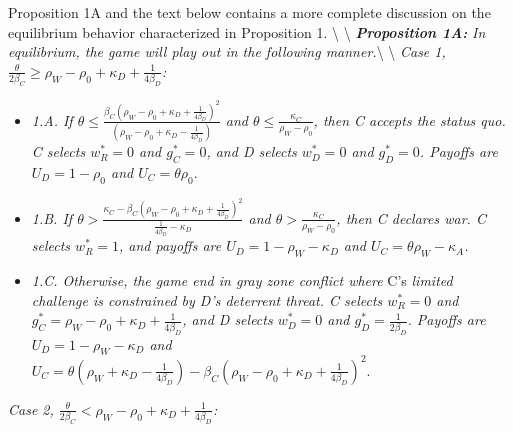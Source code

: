 \documentclass[
]{article}
\begin{document}
Proposition 1A and the text below contains a more complete discussion on
the equilibrium behavior characterized in Proposition 1.
\textbackslash{} \textbackslash{}
\textbf{\textit{Proposition 1A:}}\textit{ In equilibrium, the game will play out in the following manner.}\textbackslash{}
\textbackslash{}
\textit{Case 1, $\frac{\theta}{2\beta_{C}}\geq\rho_{W}-\rho_{0}+\kappa_{D}+\frac{1}{4\beta_{D}}$:}

\begin{itemize}
\item \textit{1.A. If $\theta\leq\frac{\beta_{C}\left(\rho_{W}-\rho_{0}+\kappa_{D}+\frac{1}{4\beta_{D}}\right)^{2}}{\left(\rho_{W}-\rho_{0}+\kappa_{D}-\frac{1}{4\beta_{D}}\right)}$ and $\theta\leq\frac{\kappa_{C}}{\rho_{W}-\rho_{0}}$, then C accepts the status quo. C selects $w_{R}^{*}=0$ and $g_{C}^{*}=0$, and D selects $w_{D}^{*}=0$ and $g_{D}^{*}=0$. Payoffs are $U_{D}=1-\rho_{0}$ and $U_{C}=\theta\rho_{0}.$} 
\item \textit{1.B. If $\theta>\frac{\kappa_{C}-\beta_{C}\left(\rho_{W}-\rho_{0}+\kappa_{D}+\frac{1}{4\beta_{D}}\right)^{2}}{\frac{1}{4\beta_{D}}-\kappa_{D}}$ and $\theta>\frac{\kappa_{C}}{\rho_{W}-\rho_{0}}$, then C declares war. C selects $w_{R}^{*}=1$, and payoffs are $U_{D}=1-\rho_{W}-\kappa_{D}$ and $U_{C}=\theta\rho_{W}-\kappa_{A}$.} 
\item \textit{1.C. Otherwise, the game end in gray zone conflict where }C's\textit{ limited challenge is constrained by D's deterrent threat. C selects $w_{R}^{*}=0$ and $g_{C}^{*}=\rho_{W}-\rho_{0}+\kappa_{D}+\frac{1}{4\beta_{D}}$, and D selects $w_{D}^{*}=0$ and $g_{D}^{*}=\frac{1}{2\beta_{D}}$. Payoffs are $U_{D}=1-\rho_{W}-\kappa_{D}$ and $U_{C}=\theta\left(\rho_{W}+\kappa_{D}-\frac{1}{4\beta_{D}}\right)-\beta_{C}\left(\rho_{W}-\rho_{0}+\kappa_{D}+\frac{1}{4\beta_{D}}\right)^{2}.$} 
\end{itemize}

\textit{Case 2, $\frac{\theta}{2\beta_{C}}<\rho_{W}-\rho_{0}+\kappa_{D}+\frac{1}{4\beta_{D}}$:}
\end{document}
